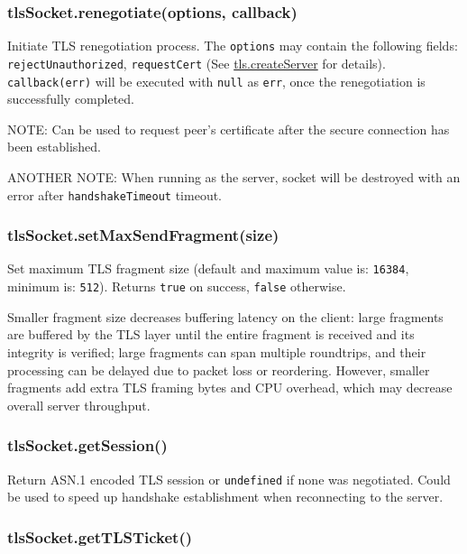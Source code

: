 \subsubsection{tlsSocket.renegotiate(options,
callback)}\label{tlssocket.renegotiateoptions-callback}

Initiate TLS renegotiation process. The \texttt{options} may contain the
following fields: \texttt{rejectUnauthorized}, \texttt{requestCert} (See
\hyperref[tlsux5ftlsux5fcreateserverux5foptionsux5fsecureconnectionlistener]{tls.createServer}
for details). \texttt{callback(err)} will be executed with \texttt{null}
as \texttt{err}, once the renegotiation is successfully completed.

NOTE: Can be used to request peer's certificate after the secure
connection has been established.

ANOTHER NOTE: When running as the server, socket will be destroyed with
an error after \texttt{handshakeTimeout} timeout.

\subsubsection{tlsSocket.setMaxSendFragment(size)}\label{tlssocket.setmaxsendfragmentsize}

Set maximum TLS fragment size (default and maximum value is:
\texttt{16384}, minimum is: \texttt{512}). Returns \texttt{true} on
success, \texttt{false} otherwise.

Smaller fragment size decreases buffering latency on the client: large
fragments are buffered by the TLS layer until the entire fragment is
received and its integrity is verified; large fragments can span
multiple roundtrips, and their processing can be delayed due to packet
loss or reordering. However, smaller fragments add extra TLS framing
bytes and CPU overhead, which may decrease overall server throughput.

\subsubsection{tlsSocket.getSession()}\label{tlssocket.getsession}

Return ASN.1 encoded TLS session or \texttt{undefined} if none was
negotiated. Could be used to speed up handshake establishment when
reconnecting to the server.

\subsubsection{tlsSocket.getTLSTicket()}\label{tlssocket.gettlsticket}

